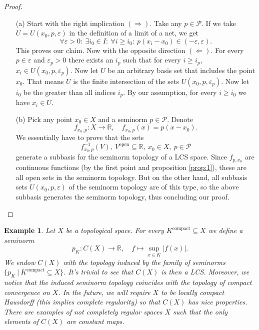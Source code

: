 \documentclass[10pt, a4paper]{article}
\newtheorem{example}[thm]{Example}
\newenvironment{noticeC}{%
  \tcolorbox[%
  notitle,
  empty,
  enhanced,  %
  breakable,
  coltext=black, 
  fontupper=\rmfamily,
  noparskip,
  sharp corners,
  boxrule=-1pt,  %
  frame hidden,
  left=7pt,  %
  right=7pt,
  top=5pt,
  bottom=5pt,
  before skip=2.5ex plus 2pt,
  after skip=2.5ex plus 2pt,
  overlay unbroken and last={%
  },
  ]}
{\endtcolorbox}
\newenvironment{myproof}%
  {\begin{noticeC}\begin{proof}}%
  {\end{proof}\end{noticeC}}
\newcommand{\R}{\mathbb {R}}
\begin{document}
\begin{myproof}
    \begin{itemize}
      \item[(a)] Start with the right implication $(\Rightarrow)$. Take any $p \in \mathcal{P}$.
      If we take $U = U(x_0, p, \varepsilon)$ in the definition of a limit of a net, we get 
      $$\forall \varepsilon > 0:\ \exists i_0 \in I:\ \forall i \geq i_0:\ p(x_i - x_0) \in (-\varepsilon, \varepsilon).$$
      This proves our claim. Now with the opposite direction $(\Leftarrow)$. For every $p \in \varepsilon$ and 
      $\varepsilon_p > 0$ there exists an $i_p$ such that for every $i \geq i_p$, $x_i \in U(x_0, p, \varepsilon_p)$.
      Now let $U$ be an arbitrary basis set that includes the point $x_0$. That means $U$ is the finite intersection of the sets 
      $U(x_0, p, \varepsilon_p)$. Now let $i_0$ be the greater than all indices $i_p$. By our assumption, 
      for every $i \geq i_0$ we have $x_i \in U$.
      \item[(b)] Pick any point $x_0 \in X$ and a seminorm $p \in \mathcal{P}$. Denote $$f_{x_0, p}: X \to \R,\quad f_{x_0, p}(x) = p(x - x_0).$$
      We essentially have to prove that the sets
      $$f_{x_0, p}^{-1} (V),\ V^{\textrm{open}} \subseteq \R,\ x_0 \in X,\ p \in \mathcal{P}$$
      generate a subbasis for the seminorm topology of a LCS space.
      Since $f_{p, x_0}$ are continuous functions (by the first point and proposition \ref{prop:1}),
      these are all open sets in the seminorm topology. But on the other hand, all subbasis sets $U(x_0, p, \varepsilon)$
      of the seminorm topology are of this type, so the above subbasis generates the seminorm topology, thus concluding our proof. \qedhere
    \end{itemize}
\end{myproof}

\begin{example}
    Let $X$ be a topological space.
        For every $K^\textrm{compact} \subseteq X$ we define a seminorm 
        $$p_K: C (X) \to \R,\quad f \mapsto \sup_{x \in K} |f(x)|.$$
        We endow $C (X)$ with the topology induced by the family of seminorms $\{p_K\ |\ K^{\textrm{compact}} \subseteq X\}$. 
        It's trivial to see that $C(X)$ is then a LCS. Moreover, we notice that the induced seminorm topology
        coincides with the topology of compact convergence on $X$. In the future, we will require $X$ to be locally compact Hausdorff (this implies complete regularity)
        so that $C(X)$ has nice properties.
        There are examples of not completely regular spaces $X$ such that the only elements of $C(X)$ are constant maps.
\end{example}
\end{document}
